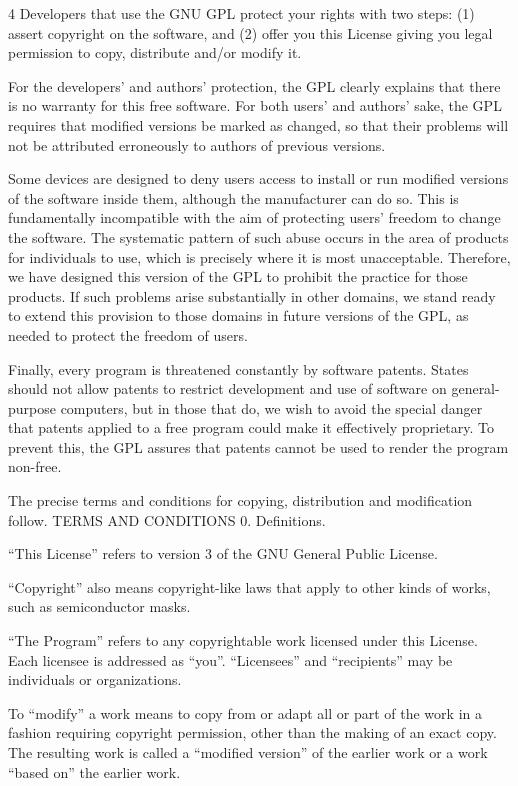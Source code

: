 \documentclass[fontsize=11pt,paper=A4,BCOR=12mm,DIV=13,open=any,listof=totoc,toc=flat]{scrbook}
\begin{document}
{\begin{multicols}{4}
Developers that use the GNU GPL protect your rights with two steps: (1) assert copyright on the software, and (2) offer you this License giving you legal permission to copy, distribute and/or modify it.

For the developers' and authors' protection, the GPL clearly explains that there is no warranty for this free software. For both users' and authors' sake, the GPL requires that modified versions be marked as changed, so that their problems will not be attributed erroneously to authors of previous versions.

Some devices are designed to deny users access to install or run modified versions of the software inside them, although the manufacturer can do so. This is fundamentally incompatible with the aim of protecting users' freedom to change the software. The systematic pattern of such abuse occurs in the area of products for individuals to use, which is precisely where it is most unacceptable. Therefore, we have designed this version of the GPL to prohibit the practice for those products. If such problems arise substantially in other domains, we stand ready to extend this provision to those domains in future versions of the GPL, as needed to protect the freedom of users.

Finally, every program is threatened constantly by software patents. States should not allow patents to restrict development and use of software on general-purpose computers, but in those that do, we wish to avoid the special danger that patents applied to a free program could make it effectively proprietary. To prevent this, the GPL assures that patents cannot be used to render the program non-free.

The precise terms and conditions for copying, distribution and modification follow.
TERMS AND CONDITIONS
0. Definitions.

“This License” refers to version 3 of the GNU General Public License.

“Copyright” also means copyright-like laws that apply to other kinds of works, such as semiconductor masks.

“The Program” refers to any copyrightable work licensed under this License. Each licensee is addressed as “you”. “Licensees” and “recipients” may be individuals or organizations.

To “modify” a work means to copy from or adapt all or part of the work in a fashion requiring copyright permission, other than the making of an exact copy. The resulting work is called a “modified version” of the earlier work or a work “based on” the earlier work.


\end{multicols}}
\end{document}
